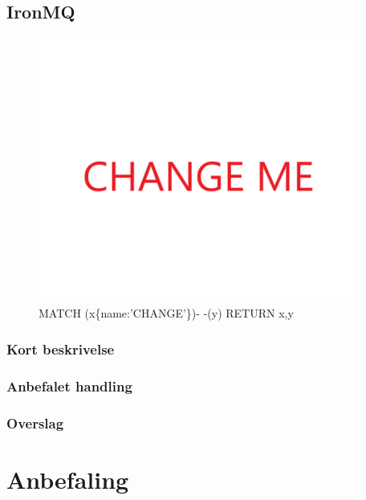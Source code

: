 \documentclass{article}
\begin{document}
\subsection{IronMQ}
\begin{figure}[h]
\includegraphics[width=300pt]{CHANGE.PNG}
\caption{MATCH (x\{name:'CHANGE'\})- -(y) RETURN x,y}
\end{figure}
\subsubsection{Kort beskrivelse}
\subsubsection{Anbefalet handling}
\subsubsection{Overslag}


\section{Anbefaling}

\end{document}
